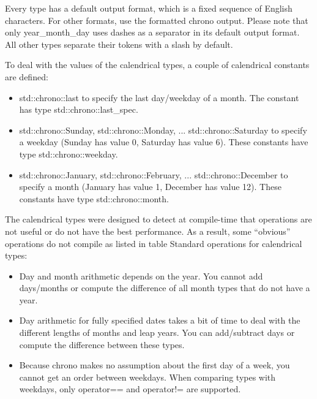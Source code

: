 Every type has a default output format, which is a fixed sequence of English characters. For other formats, use the formatted chrono output. Please note that only year\_month\_day uses dashes as a separator in its default output format. All other types separate their tokens with a slash by default.

To deal with the values of the calendrical types, a couple of calendrical constants are defined:

\begin{itemize}
\item 
std::chrono::last to specify the last day/weekday of a month. The constant has type std::chrono::last\_spec.

\item 
std::chrono::Sunday, std::chrono::Monday, ... std::chrono::Saturday to specify a weekday (Sunday has value 0, Saturday has value 6).
These constants have type std::chrono::weekday.

\item 
std::chrono::January, std::chrono::February, ... std::chrono::December to specify a month (January has value 1, December has value 12).
These constants have type std::chrono::month.
\end{itemize}


The calendrical types were designed to detect at compile-time that operations are not useful or do not have the best performance. As a result, some “obvious” operations do not compile as listed in table Standard operations for calendrical types:

\begin{itemize}
\item 
Day and month arithmetic depends on the year. You cannot add days/months or compute the difference of all month types that do not have a year.

\item 
Day arithmetic for fully specified dates takes a bit of time to deal with the different lengths of months and leap years. You can add/subtract days or compute the difference between these types.

\item 
Because chrono makes no assumption about the first day of a week, you cannot get an order between weekdays. When comparing types with weekdays, only operator== and operator!= are supported.
\end{itemize}

